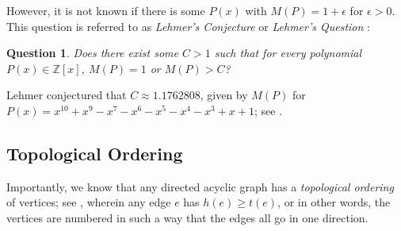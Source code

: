 \documentclass{amsart}
\theoremstyle{theorem}
\theoremstyle{theorem*}
\newtheorem{question}[theorem]{Question}
\theoremstyle{definition}
\begin{document}
However, it is not known if there is some $P(x)$ with $M(P) = 1 + \epsilon$
for $\epsilon > 0$. This question is referred to as \textit{Lehmer's Conjecture} or \textit{Lehmer's Question} \cite{m}:
\begin{question} Does there exist some $C > 1$ such that for every polynomial
    $P(x) \in \mathbb{Z}[x]$, $M(P) = 1$ or $M(P) > C$?
\end{question}
Lehmer conjectured that $C \approx 1.1762808$, given by $M(P)$ for $P(x) =
    x^{10} + x^9 - x^7 - x^6 - x^5 - x^4 - x^3 + x + 1$; see \cite{m}.



\subsection{Topological Ordering}

Importantly, we know that any directed acyclic graph has a
\textit{topological ordering} of vertices; see \cite{sw},
wherein any edge $e$ has $h(e) \geq t(e)$,
or in other words, the vertices are numbered in such a way that the
edges all go in one direction. 
\end{document}

